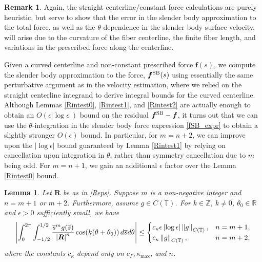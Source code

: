\documentclass[11pt]{article}
\numberwithin{equation}{section}
\newcommand{\R}{\mathbb{R}}
\newcommand{\Z}{\mathbb{Z}}
\newcommand{\T}{\mathbb{T}}
\newcommand{\bars}{\overline s}
\newcommand{\ts}{\thinspace}
\newcommand{\SB}{{\rm SB}}
\newcommand{\abs}[1]{\left\lvert #1 \right\rvert}
\newcommand{\norm}[1]{\left\lVert #1 \right\rVert}
\newtheorem{lemma}[theorem]{Lemma}
\theoremstyle{definition}
\newtheorem{remark}[theorem]{Remark}
\begin{document}
\begin{remark}
Again, the straight centerline/constant force calculations are purely heuristic, but serve to show that the error in the slender body approximation to the total force, as well as the $\theta$-dependence in the slender body surface velocity, will arise due to the curvature of the fiber centerline, the finite fiber length, and variations in the prescribed force along the centerline. \\
\end{remark}



Given a curved centerline and non-constant prescribed force ${\bm f}(s)$, we compute the slender body approximation to the force, ${\bm f}^{\SB}(s)$ using essentially the same perturbative argument as in the velocity estimation, where we relied on the straight centerline integrand to derive integral bounds for the curved centerline. \\

Although Lemmas \ref{Rintest0}, \ref{Rintest1}, and \ref{Rintest2} are actually enough to obtain an $O(\epsilon\abs{\log\epsilon})$ bound on the residual $\bm{f}^{\SB}-\bm{f}$, it turns out that we can use the $\theta$-integration in the slender body force expression \eqref{fSB_expr} to obtain a slightly stronger $O(\epsilon)$ bound. In particular, for $m=n+2$, we can improve upon the $\abs{\log\epsilon}$ bound guaranteed by Lemma \ref{Rintest1} by relying on cancellation upon integration in $\theta$, rather than symmetry cancellation due to $m$ being odd. For $m=n+1$, we gain an additional $\epsilon$ factor over the Lemma \ref{Rintest0} bound.

\begin{lemma}\label{theta_int}
Let $\bm{R}$ be as in \eqref{Reps}. Suppose $m$ is a non-negative integer and $n= m+1$ or $m+2$. Furthermore, assume $g\in C(\T)$. For $k\in \Z$, $k\neq 0$, $\theta_0\in \R$ and $\epsilon>0$ sufficiently small, we have
\begin{equation}\label{theta_int_eq}
\abs{\int_0^{2\pi}\int_{-1/2}^{1/2}\frac{\bars^m g(\bars)}{\abs{\bm{R}}^n}\cos(k(\theta+\theta_0)) \ts d\bars d\theta}
\le \begin{cases}
c_\kappa \epsilon\abs{\log\epsilon}\norm{g}_{C(\T)}, & n=m+1, \\
c_\kappa \norm{g}_{C(\T)}, & n=m+2,
\end{cases} 
\end{equation}
where the constants $c_\kappa$ depend only on $c_\Gamma, \kappa_{\max}$, and $n$. 
\end{lemma}
\end{document}

